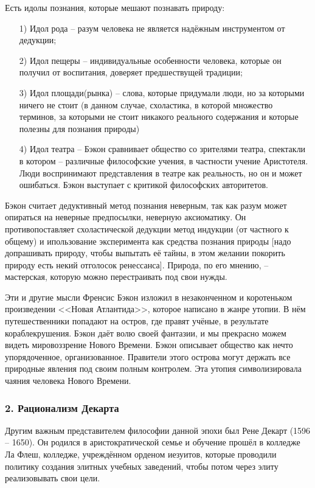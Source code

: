 \documentclass[a4paper, 12pt]{book} %
\begin{document}
Есть идолы познания, которые мешают познавать природу:
\begin{itemize}
\item[1)] Идол рода -- разум человека не является надёжным инструментом от дедукции;
\item[2)] Идол пещеры -- индивидуальные особенности человека, которые он получил от воспитания, доверяет предшествущей традиции;
\item[3)] Идол площади(рынка) -- слова, которые придумали люди, но за которыми ничего не стоит (в данном случае, схоластика, в которой множество терминов, за которыми не стоит никакого реального содержания и которые полезны для познания природы)
\item[4)] Идол театра -- Бэкон сравнивает общество со зрителями театра, спектакли в котором -- различные философские учения, в частности учение Аристотеля. Люди воспринимают представления в театре как реальность, но он и может ошибаться. Бэкон выступает с критикой философских авторитетов.	
\end{itemize}

Бэкон считает дедуктивный метод познания неверным, так как разум может опираться на неверные предпосылки, неверную аксиоматику. Он противопоставляет схоластической дедукции метод индукции (от частного к общему) и ипользование эксперимента как средства познания природы [надо допрашивать природу, чтобы выпытать её тайны, в этом желании покорить природу есть некий отголосок ренессанса]. Природа, по его мнению, -- мастерская, которую можно перестраивать под свои нужды.

Эти и другие мысли Френсис Бэкон изложил в незаконченном и коротеньком произведении <<Новая Атлантида>>, которое написано в жанре утопии. В нём путешественники попадают на остров, где правят учёные, в результате кораблекрушения. Бэкон даёт волю своей фантазии, и мы прекрасно можем видеть мировоззрение Нового Времени. Бэкон описывает общество как нечто упорядоченное, организованное. Правители этого острова могут держать все природные явления под своим полным контролем. Эта утопия символизировала чаяния человека Нового Времени.

\subsubsection*{2. Рационализм Декарта}
Другим важным представителем философии данной эпохи был Рене Декарт (1596 -- 1650). Он родился в аристократической семье и обучение прошёл в колледже Ла Флеш, колледже, учреждённом орденом иезуитов, которые проводили политику создания элитных учебных заведений, чтобы потом через элиту реализовывать свои цели. 
\end{document}
